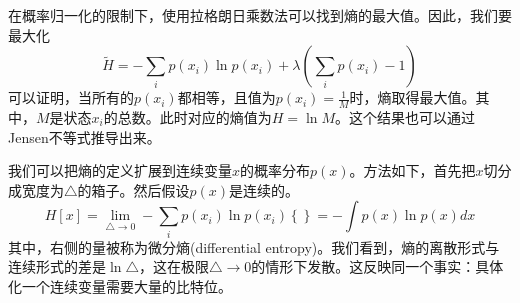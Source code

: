 在概率归一化的限制下，使用拉格朗日乘数法可以找到熵的最大值。因此，我们要最大化
\begin{equation}
	\tilde{H}=-\sum_ip(x_i)\ln p(x_i)+\lambda \left(\sum_ip(x_i)-1 \right)
\end{equation}
可以证明，当所有的$p(x_i)$都相等，且值为$p(x_i)=\frac{1}{M}$时，熵取得最大值。其中，$M$是状态$x_i$的总数。此时对应的熵值为$H=\ln M$。这个结果也可以通过Jensen不等式推导出来。

我们可以把熵的定义扩展到连续变量$x$的概率分布$p(x)$。方法如下，首先把$x$切分成宽度为$\triangle$的箱子。然后假设$p(x)$是连续的。
\begin{equation}
	H[x]=\lim_{\triangle\to 0}-\sum_ip(x_i)\ln p(x_i)\left\{ \right\}=-\int p(x)\ln p(x)dx
\end{equation}
其中，右侧的量被称为微分熵(differential entropy)。我们看到，熵的离散形式与连续形式的差是$\ln \triangle$，这在极限$\triangle\to 0$的情形下发散。这反映同一个事实：具体化一个连续变量需要大量的比特位。

